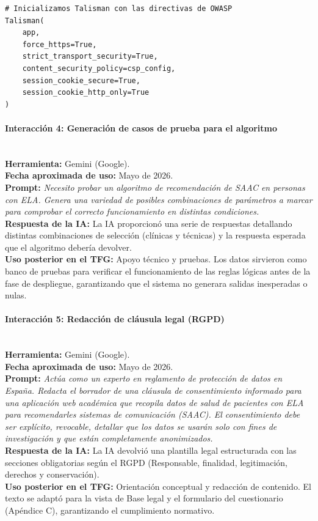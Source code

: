 \begin{verbatim}
# Inicializamos Talisman con las directivas de OWASP
Talisman(
    app,
    force_https=True,              
    strict_transport_security=True,  
    content_security_policy=csp_config,
    session_cookie_secure=True,     
    session_cookie_http_only=True   
)
\end{verbatim}

\paragraph{Interacción 4: Generación de casos de prueba para el algoritmo} \mbox{} \\
\textbf{Herramienta:} Gemini (Google). \\
\textbf{Fecha aproximada de uso:} Mayo de 2026. \\
\textbf{Prompt:} \textit{Necesito probar un algoritmo de recomendación de SAAC en personas con ELA. Genera una variedad de posibles combinaciones de parámetros a marcar para comprobar el correcto funcionamiento en distintas condiciones.} \\
\textbf{Respuesta de la IA:} La IA proporcionó una serie de respuestas detallando distintas combinaciones de selección (clínicas y técnicas) y la respuesta esperada que el algoritmo debería devolver. \\
\textbf{Uso posterior en el TFG:} Apoyo técnico y pruebas. Los datos sirvieron como banco de pruebas para verificar el funcionamiento de las reglas lógicas antes de la fase de despliegue, garantizando que el sistema no generara salidas inesperadas o nulas.

\paragraph{Interacción 5: Redacción de cláusula legal (RGPD)} \mbox{} \\
\textbf{Herramienta:} Gemini (Google). \\
\textbf{Fecha aproximada de uso:} Mayo de 2026. \\
\textbf{Prompt:} \textit{Actúa como un experto en reglamento de protección de datos en España. Redacta el borrador de una cláusula de consentimiento informado para una aplicación web académica que recopila datos de salud de pacientes con ELA para recomendarles sistemas de comunicación (SAAC). El consentimiento debe ser explícito, revocable, detallar que los datos se usarán solo con fines de investigación y que están completamente anonimizados.} \\
\textbf{Respuesta de la IA:} La IA devolvió una plantilla legal estructurada con las secciones obligatorias según el RGPD (Responsable, finalidad, legitimación, derechos y conservación). \\
\textbf{Uso posterior en el TFG:} Orientación conceptual y redacción de contenido. El texto se adaptó para la vista de Base legal y el formulario del cuestionario (Apéndice C), garantizando el cumplimiento normativo.